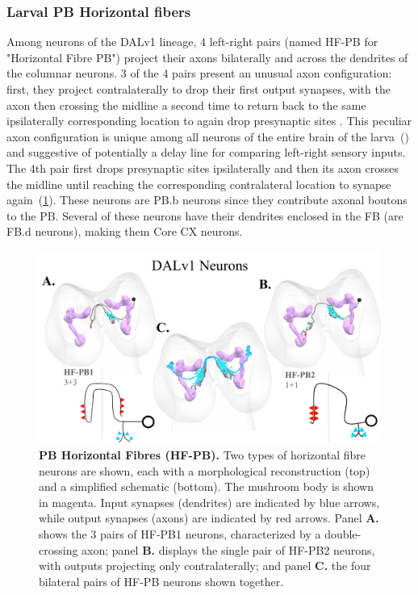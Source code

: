         \subsubsection{Larval PB Horizontal fibers}
    Among neurons of the DALv1 lineage, 4 left-right pairs (named HF-PB for "Horizontal Fibre PB") project their axons bilaterally and across the dendrites of the columnar neurons.
    3 of the 4 pairs present an unusual axon configuration: first, they project contralaterally to drop their first output synapses, with the axon then crossing the midline a second time to return back to the same ipsilaterally corresponding location to again drop presynaptic sites .
    This peculiar axon configuration is unique among all neurons of the entire brain of the larva~(\citep{winding2023connectome}) and suggestive of potentially a delay line for comparing left-right sensory inputs.
    The 4th pair first drops presynaptic sites ipsilaterally and then its axon crosses the midline until reaching the corresponding contralateral location to synapse again~(\ref{DALv1s}). These neurons are PB.b neurons since they contribute axonal boutons to the PB. Several of these neurons have their dendrites enclosed in the FB (are FB.d neurons), making them Core CX neurons. 

    \begin{figure}
        \centering
        \includegraphics[width=12cm]{Figs/CX/DALV1s.pdf}
        \caption[PB DALv1 Neurons]{\textbf{PB Horizontal Fibres (HF-PB).} Two types of horizontal fibre neurons are shown, each with a morphological reconstruction (top) and a simplified schematic (bottom). The mushroom body is shown in magenta. Input synapses (dendrites) are indicated by blue arrows, while output synapses (axons) are indicated by red arrows. Panel \textbf{A.} shows the 3 pairs of HF-PB1 neurons, characterized by a double-crossing axon; panel \textbf{B.} displays the single pair of HF-PB2 neurons, with outputs projecting only contralaterally; and panel \textbf{C.} the four bilateral pairs of HF-PB neurons shown together.}
        \label{DALv1s}
    \end{figure}

